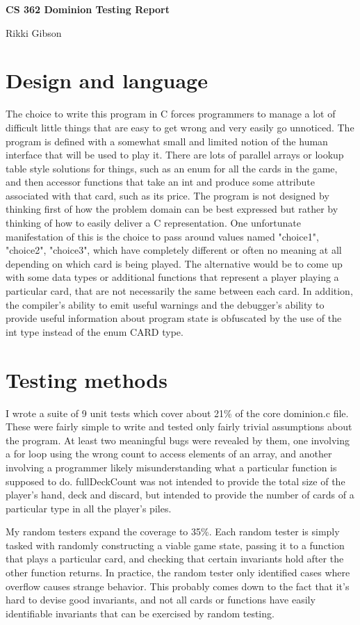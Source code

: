 \documentclass[11pt]{article}
\begin{document}
\Large\textbf{CS 362 Dominion Testing Report}

\large{Rikki Gibson}
\normalsize

\bigskip
\section{Design and language}
The choice to write this program in C forces programmers to manage a lot of difficult little things that are easy to get wrong and very easily go unnoticed. The program is defined with a somewhat small and limited notion of the human interface that will be used to play it. There are lots of parallel arrays or lookup table style solutions for things, such as an enum for all the cards in the game, and then accessor functions that take an int and produce some attribute associated with that card, such as its price. The program is not designed by thinking first of how the problem domain can be best expressed but rather by thinking of how to easily deliver a C representation. One unfortunate manifestation of this is the choice to pass around values named "choice1", "choice2", "choice3", which have completely different or often no meaning at all depending on which card is being played. The alternative would be to come up with some data types or additional functions that represent a player playing a particular card, that are not necessarily the same between each card. In addition, the compiler's ability to emit useful warnings and the debugger's ability to provide useful information about program state is obfuscated by the use of the int type instead of the enum CARD type.

\section{Testing methods}
I wrote a suite of 9 unit tests which cover about 21\% of the core dominion.c file. These were fairly simple to write and tested only fairly trivial assumptions about the program. At least two meaningful bugs were revealed by them, one involving a for loop using the wrong count to access elements of an array, and another involving a programmer likely misunderstanding what a particular function is supposed to do. fullDeckCount was not intended to provide the total size of the player's hand, deck and discard, but intended to provide the number of cards of a particular type in all the player's piles.

My random testers expand the coverage to 35\%. Each random tester is simply tasked with randomly constructing a viable game state, passing it to a function that plays a particular card, and checking that certain invariants hold after the other function returns. In practice, the random tester only identified cases where overflow causes strange behavior. This probably comes down to the fact that it's hard to devise good invariants, and not all cards or functions have easily identifiable invariants that can be exercised by random testing.
\end{document}
